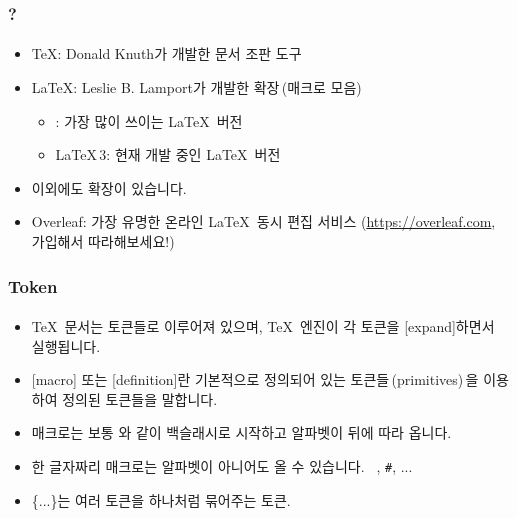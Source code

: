   
  \begin{frame}
    \frametitle{?}
    \framesubtitle{}
    \begin{itemize}
      \item \TeX: Donald Knuth가 개발한 문서 조판 도구
      \item \LaTeX: Leslie B. Lamport가 개발한  확장\,(매크로 모음)
      \begin{itemize}
        \item \LaTeXe: 가장 많이 쓰이는 \LaTeX\ 버전
        \item \LaTeX\,3: 현재 개발 중인 \LaTeX\ 버전
      \end{itemize}
      \item 이외에도  확장이 있습니다.
      \item Overleaf: 가장 유명한 온라인 \LaTeX\ 동시 편집 서비스 (\url{https://overleaf.com}, 가입해서 따라해보세요!)
    \end{itemize}
  \end{frame}
  
  \makeatletter
  \NewDocumentCommand\newterm{m o}{%
    \textbf{#1}%
    \IfNoValueF{#2}{\kern1pt{\small(#2)}\expandafter\ltx@ifnextchar@nospace{ }{}{\kern1pt}}%
  }
  \makeatother
  
  \begin{frame}[fragile]
    \frametitle{Token}
    \framesubtitle{}
    \begin{itemize}
      \item \TeX\ 문서는 토큰들로 이루어져 있으며, \TeX\ 엔진이 각 토큰을 [expand]하면서 실행됩니다.
      \item {}[macro] 또는 [definition]란 기본적으로 정의되어 있는 토큰들{\,\small(primitives)\,}을 이용하여 정의된 토큰들을 말합니다.
      \item 매크로는 보통 \texttt{\macro}와 같이 백슬래시로 시작하고 알파벳이 뒤에 따라 옵니다.
      \item 한 글자짜리 매크로는 알파벳이 아니어도 올 수 있습니다. \texttt{\ }, \texttt{\#}, ...
      \item \{...\}는 여러 토큰을 하나처럼 묶어주는 토큰.
    \end{itemize}
  \end{frame}
  
